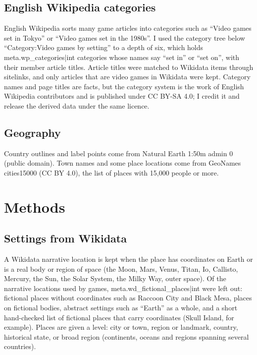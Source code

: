 \documentclass[11pt,a4paper]{article}
\begin{document}
\subsection{English Wikipedia categories}

English Wikipedia sorts many game articles into categories such as ``Video games set in Tokyo'' or ``Video games set in the 1980s''. I used the category tree below ``Category:Video games by setting'' to a depth of six, which holds {{meta.wp_categories|int}} categories whose names say ``set in'' or ``set on'', with their member article titles. Article titles were matched to Wikidata items through sitelinks, and only articles that are video games in Wikidata were kept. Category names and page titles are facts, but the category system is the work of English Wikipedia contributors and is published under CC BY-SA 4.0; I credit it and release the derived data under the same licence.

\subsection{Geography}

Country outlines and label points come from Natural Earth 1:50m admin 0 (public domain). Town names and some place locations come from GeoNames cities15000 (CC BY 4.0), the list of places with 15,000 people or more.

\section{Methods}

\subsection{Settings from Wikidata}

A Wikidata narrative location is kept when the place has coordinates on Earth or is a real body or region of space (the Moon, Mars, Venus, Titan, Io, Callisto, Mercury, the Sun, the Solar System, the Milky Way, outer space). Of the narrative locations used by games, {{meta.wd_fictional_places|int}} were left out: fictional places without coordinates such as Raccoon City and Black Mesa, places on fictional bodies, abstract settings such as ``Earth'' as a whole, and a short hand-checked list of fictional places that carry coordinates (Skull Island, for example). Places are given a level: city or town, region or landmark, country, historical state, or broad region (continents, oceans and regions spanning several countries).
\end{document}
